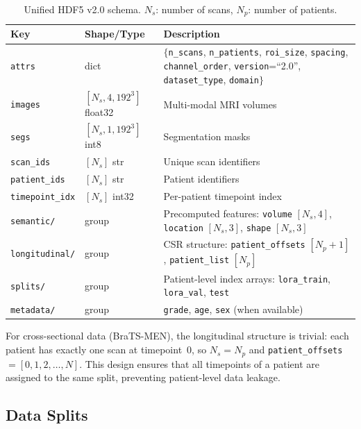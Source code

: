 \begin{table}[H]
  \centering
  \caption{Unified HDF5 v2.0 schema. $N_s$: number of scans, $N_p$: number of
  patients.}
  \label{tab:h5_schema}
  \begin{tabular}{llp{8cm}}
    \toprule
    \textbf{Key} & \textbf{Shape/Type} & \textbf{Description} \\
    \midrule
    \texttt{attrs} & dict & $\{$\texttt{n\_scans}, \texttt{n\_patients},
      \texttt{roi\_size}, \texttt{spacing}, \texttt{channel\_order},
      \texttt{version}=``2.0'', \texttt{dataset\_type}, \texttt{domain}$\}$ \\
    \texttt{images} & $[N_s, 4, 192^3]$ float32 & Multi-modal MRI volumes \\
    \texttt{segs} & $[N_s, 1, 192^3]$ int8 & Segmentation masks \\
    \texttt{scan\_ids} & $[N_s]$ str & Unique scan identifiers \\
    \texttt{patient\_ids} & $[N_s]$ str & Patient identifiers \\
    \texttt{timepoint\_idx} & $[N_s]$ int32 & Per-patient timepoint index \\
    \texttt{semantic/} & group & Precomputed features: \texttt{volume} $[N_s, 4]$, \texttt{location} $[N_s, 3]$, \texttt{shape} $[N_s, 3]$ \\
    \texttt{longitudinal/} & group & CSR structure: \texttt{patient\_offsets} $[N_p+1]$, \texttt{patient\_list} $[N_p]$ \\
    \texttt{splits/} & group & Patient-level index arrays: \texttt{lora\_train}, \texttt{lora\_val}, \texttt{test} \\
    \texttt{metadata/} & group & \texttt{grade}, \texttt{age}, \texttt{sex} (when available) \\
    \bottomrule
  \end{tabular}
\end{table}

For cross-sectional data (BraTS-MEN), the longitudinal structure is trivial:
each patient has exactly one scan at timepoint~0, so $N_s = N_p$ and
\texttt{patient\_offsets} $= [0, 1, 2, \ldots, N]$. This design ensures that
all timepoints of a patient are assigned to the same split, preventing
patient-level data leakage.

\subsection{Data Splits}
\label{sec:data:splits}

